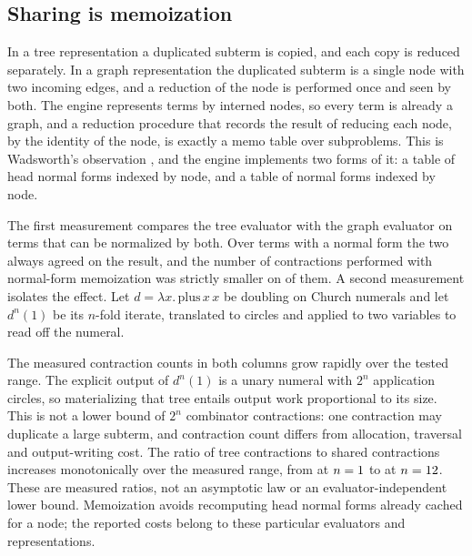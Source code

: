 \subsection{Sharing is memoization}

In a tree representation a duplicated subterm is copied, and each copy is reduced separately. In a graph representation the duplicated subterm is a single node with two incoming edges, and a reduction of the node is performed once and seen by both. The engine represents terms by interned nodes, so every term is already a graph, and a reduction procedure that records the result of reducing each node, by the identity of the node, is exactly a memo table over subproblems. This is Wadsworth's observation \cite{wadsworth}, and the engine implements two forms of it: a table of head normal forms indexed by node, and a table of normal forms indexed by node.

The first measurement compares the tree evaluator with the graph evaluator on terms that can be normalized by both. Over \factMachineCompared{} terms with a normal form the two always agreed on the result, and the number of contractions performed with normal-form memoization was strictly smaller on \factSharedLess{} of them. A second measurement isolates the effect. Let $d=\lambda x.\,\mathrm{plus}\,x\,x$ be doubling on Church numerals and let $d^n(1)$ be its $n$-fold iterate, translated to circles and applied to two variables to read off the numeral.

\begin{center}
\tableSharing
\end{center}

The measured contraction counts in both columns grow rapidly over the tested range. The explicit output of $d^n(1)$ is a unary numeral with $2^n$ application circles, so materializing that tree entails output work proportional to its size. This is not a lower bound of $2^n$ combinator contractions: one contraction may duplicate a large subterm, and contraction count differs from allocation, traversal and output-writing cost. The ratio of tree contractions to shared contractions increases monotonically over the measured range, from \factShareRatioFirst{} at $n=1$ to \factShareRatioLast{} at $n=12$. These are measured ratios, not an asymptotic law or an evaluator-independent lower bound. Memoization avoids recomputing head normal forms already cached for a node; the reported costs belong to these particular evaluators and representations.

